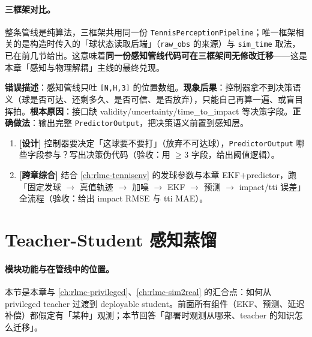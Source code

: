 \paragraph{三框架对比。}整条管线是纯算法，三框架共用同一份 \verb|TennisPerceptionPipeline|；唯一框架相关的是构造时传入的「球状态读取后端」（\verb|raw_obs| 的来源）与 \verb|sim_time| 取法，已在前几节给出。这意味着\textbf{同一份感知管线代码可在三框架间无修改迁移}——这是本章「感知与物理解耦」主线的最终兑现。

\begin{pitfall}
\textbf{错误描述}：感知管线只吐 \verb|[N,H,3]| 的位置数组。\textbf{现象后果}：控制器拿不到决策语义（球是否可达、还剩多久、是否可信、是否放弃），只能自己再算一遍、或盲目挥拍。\textbf{根本原因}：接口缺 validity/uncertainty/time\_to\_impact 等决策字段。\textbf{正确做法}：输出完整 \verb|PredictorOutput|，把决策语义前置到感知层。
\end{pitfall}

\begin{practice}[本节动手任务]
\begin{enumerate}
  \item \textbf{[设计]} 控制器要决定「这球要不要打」（放弃不可达球），\verb|PredictorOutput| 哪些字段参与？写出决策伪代码（验收：用 $\ge 3$ 字段，给出阈值逻辑）。
  \item \textbf{[跨章综合]} 结合 \cref{ch:rlmc-tennisenv} 的发球参数与本章 EKF$+$predictor，跑「固定发球 $\to$ 真值轨迹 $\to$ 加噪 $\to$ EKF $\to$ 预测 $\to$ impact/tti 误差」全流程（验收：给出 impact RMSE 与 tti MAE）。
\end{enumerate}
\end{practice}

\section{Teacher-Student 感知蒸馏}
\label{sec:rlmc-perc-distill}

\paragraph{模块功能与在管线中的位置。}本节是本章与 \cref{ch:rlmc-privileged}、\cref{ch:rlmc-sim2real} 的汇合点：如何从 privileged teacher 过渡到 deployable student。前面所有组件（EKF、预测、延迟补偿）都假定有「某种」观测；本节回答「部署时观测从哪来、teacher 的知识怎么迁移」。

